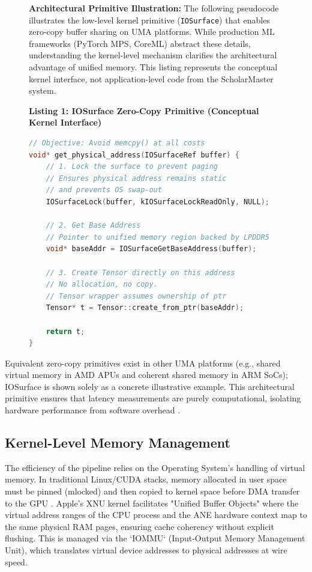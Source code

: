 \documentclass[conference]{IEEEtran}
\begin{document}
\begin{figure}[htbp]
\vspace{0.2cm}
\textbf{Architectural Primitive Illustration:} The following pseudocode illustrates the low-level kernel primitive (\texttt{IOSurface}) that enables zero-copy buffer sharing on UMA platforms. While production ML frameworks (PyTorch MPS, CoreML) abstract these details, understanding the kernel-level mechanism clarifies the architectural advantage of unified memory. This listing represents the conceptual kernel interface, not application-level code from the ScholarMaster system.

\vspace{0.2cm}
\textbf{Listing 1: IOSurface Zero-Copy Primitive (Conceptual Kernel Interface)}
\begin{lstlisting}[language=C++]
// Objective: Avoid memcpy() at all costs
void* get_physical_address(IOSurfaceRef buffer) {
    // 1. Lock the surface to prevent paging
    // Ensures physical address remains static
    // and prevents OS swap-out
    IOSurfaceLock(buffer, kIOSurfaceLockReadOnly, NULL);
      
    // 2. Get Base Address 
    // Pointer to unified memory region backed by LPDDR5
    void* baseAddr = IOSurfaceGetBaseAddress(buffer);
      
    // 3. Create Tensor directly on this address
    // No allocation, no copy.
    // Tensor wrapper assumes ownership of ptr
    Tensor* t = Tensor::create_from_ptr(baseAddr);
      
    return t; 
}
\end{lstlisting}
\label{code:zerocopy}
\end{figure}

Equivalent zero-copy primitives exist in other UMA platforms (e.g., shared virtual memory in AMD APUs and coherent shared memory in ARM SoCs); IOSurface is shown solely as a concrete illustrative example. This architectural primitive ensures that latency measurements are purely computational, isolating hardware performance from software overhead \cite{b24}.

\subsection{Kernel-Level Memory Management}
The efficiency of the pipeline relies on the Operating System's handling of virtual memory. In traditional Linux/CUDA stacks, memory allocated in user space must be pinned (mlocked) and then copied to kernel space before DMA transfer to the GPU \cite{b29}. Apple's XNU kernel facilitates "Unified Buffer Objects" where the virtual address ranges of the CPU process and the ANE hardware context map to the same physical RAM pages, ensuring cache coherency without explicit flushing.  This is managed via the `IOMMU` (Input-Output Memory Management Unit), which translates virtual device addresses to physical addresses at wire speed.
\end{document}

